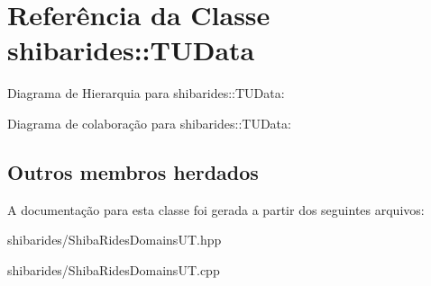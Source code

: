 \hypertarget{classshibarides_1_1TUData}{}\section{Referência da Classe shibarides\+:\+:T\+U\+Data}
\label{classshibarides_1_1TUData}


Diagrama de Hierarquia para shibarides\+:\+:T\+U\+Data\+:


Diagrama de colaboração para shibarides\+:\+:T\+U\+Data\+:
\subsection*{Outros membros herdados}


A documentação para esta classe foi gerada a partir dos seguintes arquivos\+:\begin{DoxyCompactItemize}
\item 
shibarides/Shiba\+Rides\+Domains\+U\+T.\+hpp\item 
shibarides/Shiba\+Rides\+Domains\+U\+T.\+cpp\end{DoxyCompactItemize}
